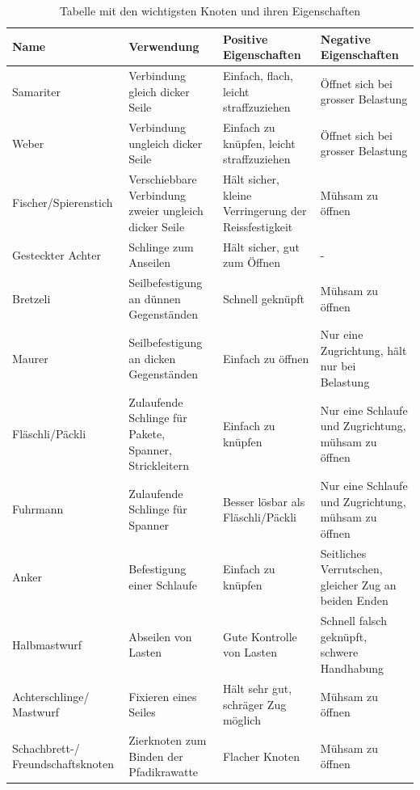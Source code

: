 \begin{center}
\begin{table}
\begin{tabularx}{\textwidth}{X|X|X|X}
\textbf{Name} & \textbf{Verwendung} & \textbf{Positive Eigenschaften} & \textbf{Negative Eigenschaften} \\\hline
Samariter & Verbindung gleich dicker Seile & Einfach, flach, leicht straffzuziehen & Öffnet sich bei grosser Belastung \\\hline
Weber & Verbindung ungleich dicker Seile & Einfach zu knüpfen, leicht straffzuziehen & Öffnet sich bei grosser Belastung \\\hline
Fischer/Spierenstich & Verschiebbare Verbindung zweier ungleich dicker Seile & Hält sicher, kleine Verringerung der Reissfestigkeit & Mühsam zu öffnen \\\hline
Gesteckter Achter & Schlinge zum Anseilen & Hält sicher, gut zum Öffnen & - \\\hline
Bretzeli & Seilbefestigung an dünnen Gegenständen & Schnell geknüpft & Mühsam zu öffnen \\\hline
Maurer & Seilbefestigung an dicken Gegenständen & Einfach zu öffnen & Nur eine Zugrichtung, hält nur bei Belastung \\\hline
Fläschli/Päckli & Zulaufende Schlinge für Pakete, Spanner, Strickleitern & Einfach zu knüpfen & Nur eine Schlaufe und Zugrichtung, mühsam zu öffnen \\\hline
Fuhrmann & Zulaufende Schlinge für Spanner & Besser lösbar als Fläschli/Päckli & Nur eine Schlaufe und Zugrichtung, mühsam zu öffnen \\\hline
Anker & Befestigung einer Schlaufe & Einfach zu knüpfen & Seitliches Verrutschen, gleicher Zug an beiden Enden \\\hline
Halbmastwurf & Abseilen von Lasten & Gute Kontrolle von Lasten & Schnell falsch geknüpft, schwere Handhabung \\\hline
Achterschlinge/ Mastwurf & Fixieren eines Seiles & Hält sehr gut, schräger Zug möglich & Mühsam zu öffnen \\\hline
Schachbrett-/ Freundschaftsknoten & Zierknoten zum Binden der Pfadikrawatte & Flacher Knoten & Mühsam zu öffnen \\
\end{tabularx}
\caption{Tabelle mit den wichtigsten Knoten und ihren Eigenschaften}
\end{table}
\end{center}

\newpage

